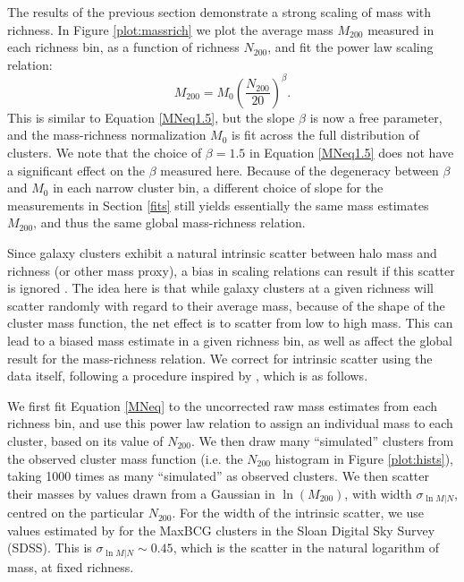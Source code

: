 \label{sec:MN}
The results of the previous section demonstrate a strong scaling of mass with richness. In Figure \ref{plot:massrich} we plot the average mass $M_{200}$ measured in each richness bin, as a function of richness $N_{200}$, and fit the power law scaling relation:
\begin{equation}
\label{MNeq}
M_{200} = M_0 \left( \frac{N_{200}}{20} \right)^\beta.
\end{equation}
This is similar to Equation \ref{MNeq1.5}, but the slope $\beta$ is now a free parameter, and the mass-richness normalization $M_0$ is fit across the full distribution of clusters. We note that the choice of $\beta=1.5$ in Equation \ref{MNeq1.5} does not have a significant effect on the $\beta$ measured here. Because of the degeneracy between $\beta$ and $M_0$ in each narrow cluster bin, a different choice of slope for the measurements in Section \ref{fits} still yields essentially the same mass estimates $M_{200}$, and thus the same global mass-richness relation.

Since galaxy clusters exhibit a natural intrinsic scatter between halo mass and richness (or other mass proxy), a bias in scaling relations can result if this scatter is ignored \citep{Rozo09a}. The idea here is that while galaxy clusters at a given richness will scatter randomly with regard to their average mass, because of the shape of the cluster mass function, the net effect is to scatter from low to high mass. This can lead to a biased mass estimate in a given richness bin, as well as affect the global result for the mass-richness relation. We correct for intrinsic scatter using the data itself, following a procedure inspired by \citet{Velander14}, which is as follows.

We first fit Equation \ref{MNeq} to the uncorrected raw mass estimates from each richness bin, and use this power law relation to assign an individual mass to each cluster, based on its value of $N_{200}$. We then draw many ``simulated'' clusters from the observed cluster mass function (i.e. the $N_{200}$ histogram in Figure \ref{plot:hists}), taking 1000 times as many ``simulated'' as observed clusters. We then scatter their masses by values drawn from a Gaussian in $\ln (M_{200})$, with width $\sigma_{\ln M|N}$, centred on the particular $N_{200}$. For the width of the intrinsic scatter, we use values estimated by \citet{Rozo09a} for the MaxBCG clusters in the Sloan Digital Sky Survey (SDSS). This is $\sigma_{\ln M|N} \sim 0.45$, which is the scatter in the natural logarithm of mass, at fixed richness.

